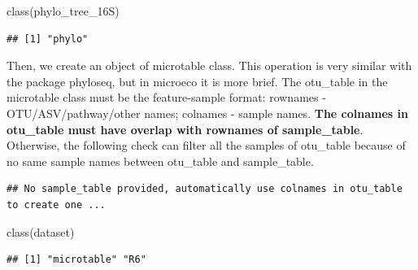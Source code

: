 \documentclass[
]{book}
\newenvironment{Shaded}{\begin{snugshade}}{\end{snugshade}}
\newcommand{\AttributeTok}[1]{\textcolor[rgb]{0.77,0.63,0.00}{#1}}
\newcommand{\CommentTok}[1]{\textcolor[rgb]{0.56,0.35,0.01}{\textit{#1}}}
\newcommand{\FunctionTok}[1]{\textcolor[rgb]{0.00,0.00,0.00}{#1}}
\newcommand{\NormalTok}[1]{#1}
\newcommand{\OtherTok}[1]{\textcolor[rgb]{0.56,0.35,0.01}{#1}}
\newcommand{\SpecialCharTok}[1]{\textcolor[rgb]{0.00,0.00,0.00}{#1}}
\begin{document}
\begin{Shaded}
\begin{Highlighting}[]
\FunctionTok{class}\NormalTok{(phylo\_tree\_16S)}
\end{Highlighting}
\end{Shaded}

\begin{verbatim}
## [1] "phylo"
\end{verbatim}

Then, we create an object of microtable class.
This operation is very similar with the package phyloseq\citep{Mcmurdie_phyloseq_2013}, but in microeco it is more brief.
The otu\_table in the microtable class must be the feature-sample format: rownames - OTU/ASV/pathway/other names; colnames - sample names.
\textbf{The colnames in otu\_table must have overlap with rownames of sample\_table}.
Otherwise, the following check can filter all the samples of otu\_table because of no same sample names between otu\_table and sample\_table.

\begin{Shaded}
\end{Shaded}

\begin{verbatim}
## No sample_table provided, automatically use colnames in otu_table to create one ...
\end{verbatim}

\begin{Shaded}
\begin{Highlighting}[]
\FunctionTok{class}\NormalTok{(dataset)}
\end{Highlighting}
\end{Shaded}

\begin{verbatim}
## [1] "microtable" "R6"
\end{verbatim}

\begin{Shaded}
\end{Shaded}
\end{document}
